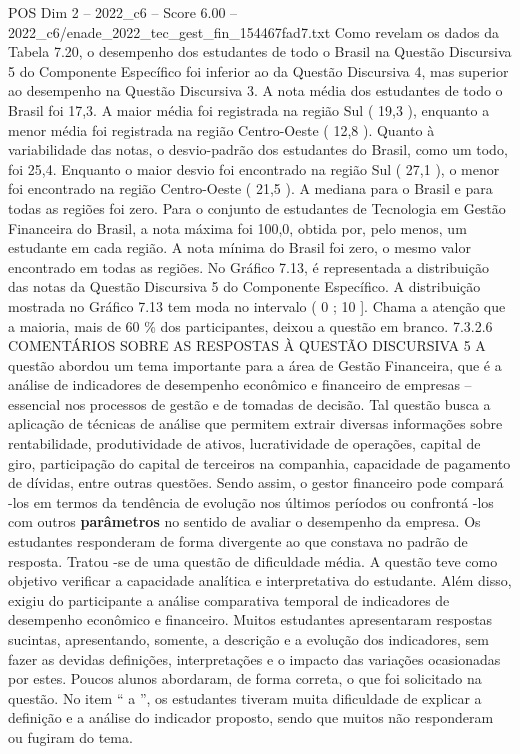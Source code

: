\begin{textsample}{POS Dim 2 – 2022\_c6 – Score 6.00 – 2022\_c6/enade\_2022\_tec\_gest\_fin\_154467fad7.txt}
Como revelam os dados da Tabela 7.20, o desempenho dos estudantes de todo o Brasil na Questão Discursiva 5 do Componente Específico foi inferior ao da Questão Discursiva 4, mas superior ao desempenho na Questão Discursiva 3.
A nota média dos estudantes de todo o Brasil foi 17,3.
A maior média foi registrada na região Sul ( 19,3 ), enquanto a menor média foi registrada na região Centro-Oeste ( 12,8 ).
Quanto à variabilidade das notas, o desvio-padrão dos estudantes do Brasil, como um todo, foi 25,4.
Enquanto o maior desvio foi encontrado na região Sul ( 27,1 ), o menor foi encontrado na região Centro-Oeste ( 21,5 ).
A mediana para o Brasil e para todas as regiões foi zero.
Para o conjunto de estudantes de Tecnologia em Gestão Financeira do Brasil, a nota máxima foi 100,0, obtida por, pelo menos, um estudante em cada região.
A nota mínima do Brasil foi zero, o mesmo valor encontrado em todas as regiões.
No Gráfico 7.13, é representada a distribuição das notas da Questão Discursiva 5 do Componente Específico.
A distribuição mostrada no Gráfico 7.13 tem moda no intervalo ( 0 ; 10 ].
Chama a atenção que a maioria, mais de 60 \% dos participantes, deixou a questão em branco. 7.3.2.6 COMENTÁRIOS SOBRE AS RESPOSTAS À QUESTÃO DISCURSIVA 5 A questão abordou um tema importante para a área de Gestão Financeira, que é a análise de indicadores de desempenho econômico e financeiro de empresas – essencial nos processos de gestão e de tomadas de decisão.
Tal questão busca a aplicação de técnicas de análise que permitem extrair diversas informações sobre rentabilidade, produtividade de ativos, lucratividade de operações, capital de giro, participação do capital de terceiros na companhia, capacidade de pagamento de dívidas, entre outras questões.
Sendo assim, o gestor financeiro pode compará -los em termos da tendência de evolução nos últimos períodos ou confrontá -los com outros \textbf{parâmetros} no sentido de avaliar o desempenho da empresa.
Os estudantes responderam de forma divergente ao que constava no padrão de resposta.
Tratou -se de uma questão de dificuldade média.
A questão teve como objetivo verificar a capacidade analítica e interpretativa do estudante.
Além disso, exigiu do participante a análise comparativa temporal de indicadores de desempenho econômico e financeiro.
Muitos estudantes apresentaram respostas sucintas, apresentando, somente, a descrição e a evolução dos indicadores, sem fazer as devidas definições, interpretações e o impacto das variações ocasionadas por estes.
Poucos alunos abordaram, de forma correta, o que foi solicitado na questão.
No item “ a ”, os estudantes tiveram muita dificuldade de explicar a definição e a análise do indicador proposto, sendo que muitos não responderam ou fugiram do tema.

\end{textsample}
